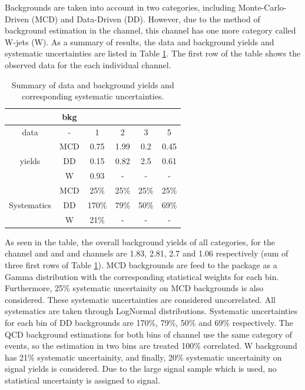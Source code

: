 Backgrounds are taken into account in two categories, including Monte-Carlo-Driven (MCD) and Data-Driven (DD).
However, due to the method of background estimation in the \tauTau channel, \binone  this channel has one more category 
called W-jets (W).
As a summary of results, the data and background yields and systematic uncertainties are listed in Table \ref{tbl:yieldSysSummary}. 
The first row of the table shows the observed data for the each individual channel.  
\begin{table}[h]
\begin{center}
\begin{tabular}{c|c|c|c|c|c}
\hline
\hline
	& bkg	& \tauTau\binone & \tauTau\bintwo & \eTau\binone & \muTau\binone \\
\hline
\hline
data			& -   & 1     & 2    & 3   & 5 \\  
\hline
\multirow{3}{*}{yields} &MCD  & 0.75  & 1.99 & 0.2 & 0.45 \\
                        &DD   & 0.15  & 0.82 & 2.5 & 0.61 \\
                        &W    & 0.93  &  - &  -  &  -  \\
\hline
\multirow{3}{*}{Systematics}&MCD  & 25\%   &   25\% & 25\% & 25\% \\
                            &DD   & 170\%  &   79\% & 50\% & 69\% \\
                            &W    & 21\%   &    -  &   -  & - \\
\hline
\hline
\end{tabular}
\caption{Summary of data and background yields and corresponding systematic uncertainties.}
\label{tbl:yieldSysSummary}
\end{center}
\end{table}
As seen in the table, the overall background yields of all categories, 
for the \tauTau channel \binone and \bintwo and \eTau and \muTau channels are  
1.83, 2.81, 2.7 and 1.06 respectively (sum of three first rows of Table \ref{tbl:yieldSysSummary}).
MCD backgrounds are feed to the package as a Gamma distribution with the corresponding statistical weights for each bin.
Furthermore, 25\% systematic uncertainity on MCD backgrounds is also considered. These systematic uncertainties are considered uncorrelated.
All systematics are taken through LogNormal distributions. 
Systematic uncertainties for each bin of DD backgrounds are 170\%, 79\%, 50\% and 69\% respectively. The QCD background estimations for 
both bins of \tauTau channel use the same category of events, so the estimation in two bins are treated 100\% correlated.
W background has 21\% systematic uncertainity, and finally, 20\% systematic uncertainity on signal yields is considered. 
Due to the large signal sample which is used, no statistical uncertainty is assigned to signal.

